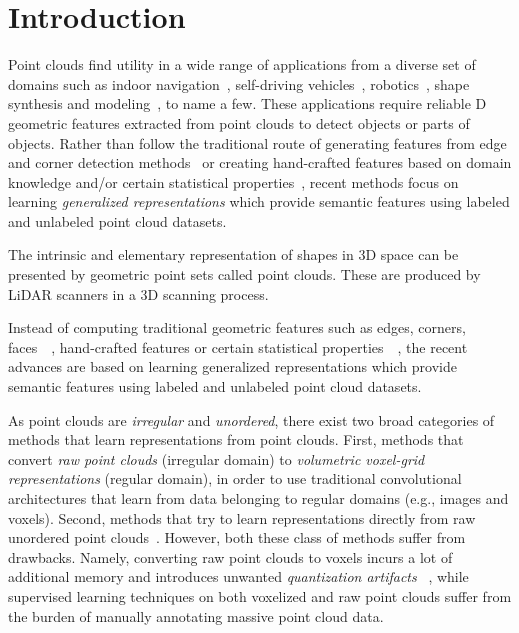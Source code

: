 \documentclass{article}
\begin{document}
\section{Introduction}
Point clouds find utility in a wide range of applications from a diverse set of domains such as indoor navigation~\cite{zhu2017target}, self-driving vehicles~\cite{liang2018deep}, robotics~\cite{rusu2008towards}, shape synthesis and modeling~\cite{golovinskiy2009shape}, to name a few. These applications require reliable D geometric features extracted from point clouds to detect objects or parts of objects. Rather than follow the traditional route of generating features from edge and corner detection methods~\cite{guo20143d,lu2014recognizing} or creating hand-crafted features based on domain knowledge and/or certain statistical properties~\cite{rusu2008aligning,rusu2009fast}, recent methods focus on learning \emph{generalized representations} which provide semantic features using labeled and unlabeled point cloud datasets.

The intrinsic and elementary representation of shapes in 3D space can be presented by geometric point sets called point clouds. These are produced by LiDAR scanners in a 3D scanning process. 

 Instead of computing traditional geometric features such as edges, corners, faces~\cite{guo20143d}~\cite{lu2014recognizing}, hand-crafted features or certain statistical properties~\cite{rusu2008aligning}~\cite{rusu2009fast}, the recent advances are based on learning generalized representations which provide semantic features using labeled and unlabeled point cloud datasets. 
\fi
 
 As point clouds are \emph{irregular} and \emph{unordered}, there exist two broad categories of methods that learn representations from point clouds. 
 First, methods that convert \emph{raw point clouds} (irregular domain) to \emph{volumetric voxel-grid representations} (regular domain), in order to use traditional convolutional architectures that learn from data belonging to regular domains (e.g., images and voxels). 
 Second, methods that try to learn representations directly from raw unordered point clouds~\cite{dgcnn,qi2017pointnet,qi2017pointnet++,li2018pointcnn}. 
 However, both these class of methods suffer from drawbacks. Namely, converting raw point clouds to voxels incurs a lot of additional memory and introduces unwanted \emph{quantization artifacts} ~\cite{huang1998accurate}, while supervised learning techniques on both voxelized and raw point clouds suffer from the burden of manually annotating massive point cloud data.
\end{document}
